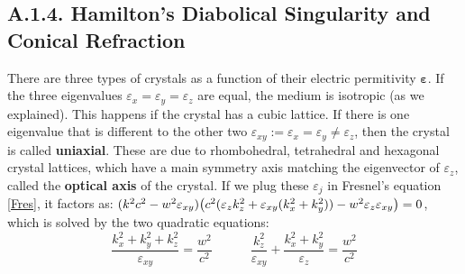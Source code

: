 \documentclass[11pt, a4paper, twoside]{article} %
\begin{document}
\subsection*{A.1.4. Hamilton's Diabolical Singularity and Conical Refraction\vspace{-0.2cm}}
There are three types of crystals as a function of their electric permitivity $\pmb{\varepsilon}$. If the three eigenvalues $\varepsilon_x=\varepsilon_y=\varepsilon_z$ are equal, the medium is isotropic (as we explained). This happens if the crystal has a cubic lattice. If there is one eigenvalue that is different to the other two $\varepsilon_{xy}:=\varepsilon_x=\varepsilon_y\neq \varepsilon_z$, then the crystal is called {\bf uniaxial}. These are due to rhombohedral, tetrahedral and hexagonal crystal lattices, which have a main symmetry axis matching the eigenvector of $\varepsilon_z$, called the {\bf optical axis} of the crystal. If we plug these $\varepsilon_j$ in Fresnel's equation \eqref{Fres}, it factors as: $(k^2c^2-w^2\varepsilon_{xy})\qty(c^2(\varepsilon_zk_z^2+\varepsilon_{xy}(k_x^2+k_y^2))-w^2\varepsilon_z\varepsilon_{xy})=0$, which is solved by the two quadratic equations:
\begin{equation}
\frac{k_x^2+k_y^2+k_z^2}{\varepsilon_{xy}}=\frac{w^2}{c^2} \quad \quad \quad \frac{k_z^2}{\varepsilon_{xy}}+\frac{k_x^2+k_y^2}{\varepsilon_z}=\frac{w^2}{c^2}
\end{equation}
\end{document}
